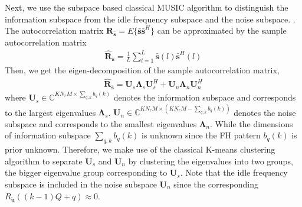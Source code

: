 \documentclass[journal,10pt]{IEEEtran}
\begin{document}
Next, we use the  subspace based classical MUSIC algorithm to distinguish the information subspace from the idle frequency subspace and the noise subspace. . 
The autocorrelation matrix $\boldsymbol{R}_{\bar{\boldsymbol{s}}}=E\{\bar{\boldsymbol{s}}\bar{\boldsymbol{s}}^H\}$ can be approximated by the sample autocorrelation matrix
\begin{align}\label{eq:16}
   \hat{\boldsymbol{R}}_{\bar{\boldsymbol{s}}}=\frac{1}{L}\sum_{l=1}^L \bar{\boldsymbol{s}}(l)\bar{\boldsymbol{s}}^H(l)
\end{align}
Then, we get the eigen-decomposition of the sample autocorrelation matrix,
\begin{align}\label{eq:17}
    \hat{\boldsymbol{R}}_{\bar{\boldsymbol{s}}}=\boldsymbol{U}_s\boldsymbol{\Lambda}_s\boldsymbol{U}_s^H+\boldsymbol{U}_n\boldsymbol{\Lambda}_n\boldsymbol{U}_n^H
\end{align}
where $\boldsymbol{U}_s\in \mathbb{C}^{KN_rM\times \sum_{q,k}b_q(k)}$  denotes the information subspace and corresponds to the largest eigenvalues $\boldsymbol{\Lambda}_s$. $\boldsymbol{U}_n\in \mathbb{C}^{KN_rM\times (KN_rM-\sum_{q,k}b_q(k))}$ denotes the noise subspace and corresponds to the smallest eigenvalues $\boldsymbol{\Lambda}_n$. 
While the dimensions of information subspace $\sum_{q,k}b_q(k)$ is unknown since the FH pattern $b_q(k)$ is prior unknown. 
Therefore, we make use of the classical K-means clustering algorithm \cite{Bengio2013Deep,Angelov2012Fundamentals} to separate  $\boldsymbol{U}_s$ and $\boldsymbol{U}_n$ by clustering the eigenvalues into two groups, the bigger eigenvalue group corresponding to $\boldsymbol{U}_s$.
Note that the idle frequency subspace is included in the noise subspace $\boldsymbol{U}_n$ since the corresponding $R_{\tilde{\boldsymbol{u}}}((k-1)Q+q)\approx 0$.
\end{document}
